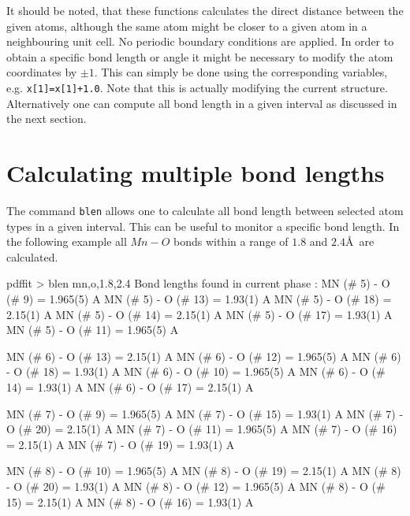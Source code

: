 \noindent It should be noted, that these functions calculates the
direct distance between the given atoms, although the same atom
might be closer to a given atom in a neighbouring unit cell. No
periodic boundary conditions are applied. In order to obtain a
specific bond length or angle it might be necessary to modify the
atom coordinates by $\pm 1$. This can simply be done using the
corresponding variables, e.g. {\tt x[1]=x[1]+1.0}. Note that this
is actually modifying the current structure. Alternatively one can
compute all bond length in a given interval as discussed in the
next section.


\section{Calculating multiple bond lengths \label{misc_mult}}

The command {\tt blen} allows one to calculate all bond length
between selected atom types in a given interval. This can be
useful to monitor a specific bond length. In the following example
all $Mn-O$ bonds within a range of $1.8$ and $2.4$\AA\ are
calculated.

\footnotesize
\begin{MacVerbatim}
  pdffit > blen mn,o,1.8,2.4
   Bond lengths found in current phase :
     MN (#    5) -    O (#    9)   =          1.965(5) A
     MN (#    5) -    O (#   13)   =           1.93(1) A
     MN (#    5) -    O (#   18)   =           2.15(1) A
     MN (#    5) -    O (#   14)   =           2.15(1) A
     MN (#    5) -    O (#   17)   =           1.93(1) A
     MN (#    5) -    O (#   11)   =          1.965(5) A

     MN (#    6) -    O (#   13)   =           2.15(1) A
     MN (#    6) -    O (#   12)   =          1.965(5) A
     MN (#    6) -    O (#   18)   =           1.93(1) A
     MN (#    6) -    O (#   10)   =          1.965(5) A
     MN (#    6) -    O (#   14)   =           1.93(1) A
     MN (#    6) -    O (#   17)   =           2.15(1) A

     MN (#    7) -    O (#    9)   =          1.965(5) A
     MN (#    7) -    O (#   15)   =           1.93(1) A
     MN (#    7) -    O (#   20)   =           2.15(1) A
     MN (#    7) -    O (#   11)   =          1.965(5) A
     MN (#    7) -    O (#   16)   =           2.15(1) A
     MN (#    7) -    O (#   19)   =           1.93(1) A

     MN (#    8) -    O (#   10)   =          1.965(5) A
     MN (#    8) -    O (#   19)   =           2.15(1) A
     MN (#    8) -    O (#   20)   =           1.93(1) A
     MN (#    8) -    O (#   12)   =          1.965(5) A
     MN (#    8) -    O (#   15)   =           2.15(1) A
     MN (#    8) -    O (#   16)   =           1.93(1) A
\end{MacVerbatim}
\normalsize


